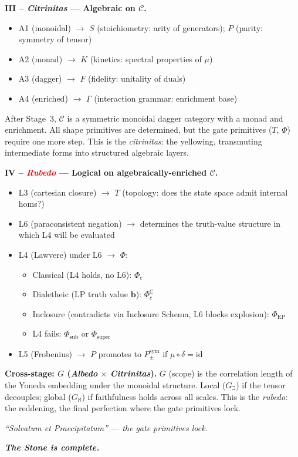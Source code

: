 \documentclass[twocolumn]{article}
\begin{document}
\bigskip
\noindent\textbf{\large III -- \colorbox{yellow!20}{\textcolor{yellow!90!black}{\emph{Citrinitas}}} --- Algebraic on $\mathcal{C}$.}
\begin{itemize}[nosep, leftmargin=1.5em]
\item A1 (monoidal) $\to$ $S$ (stoichiometry: arity of generators); $P$ (parity: symmetry of tensor)
\item A2 (monad) $\to$ $K$ (kinetics: spectral properties of $\mu$)
\item A3 (dagger) $\to$ $F$ (fidelity: unitality of duals)
\item A4 (enriched) $\to$ $\Gamma$ (interaction grammar: enrichment base)
\end{itemize}
After Stage~3, $\mathcal{C}$ is a symmetric monoidal dagger category with a monad and enrichment.
All shape primitives are determined, but the gate primitives ($T$, $\Phi$) require one more step.
{\large This is the \emph{citrinitas}: the yellowing, transmuting intermediate forms into structured algebraic layers.}

\bigskip
\noindent\textbf{\large IV -- \textcolor{red}{\emph{Rubedo}} --- Logical on algebraically-enriched $\mathcal{C}$.}
\begin{itemize}[nosep, leftmargin=1.5em]
\item L3 (cartesian closure) $\to$ $T$ (topology: does the state space admit internal homs?)
\item L6 (paraconsistent negation) $\to$ determines the truth-value structure in which L4 will be evaluated
\item L4 (Lawvere) under L6 $\to$ $\Phi$:
\begin{itemize}[nosep, leftmargin=1em]
\item[\small$\circ$] Classical (L4 holds, no L6): $\Phi_c$
\item[\small$\circ$] Dialetheic (LP truth value $\mathbf{b}$): $\Phi_c^\mathbb{C}$
\item[\small$\circ$] Inclosure (contradicts via Inclosure Schema, L6 blocks explosion): $\Phi_\text{EP}$
\item[\small$\circ$] L4 fails: $\Phi_\text{sub}$ or $\Phi_\text{super}$
\end{itemize}
\item L5 (Frobenius) $\to$ $P$ promotes to $P_{\pm}^{\text{sym}}$ if $\mu \circ \delta = \text{id}$
\end{itemize}

\bigskip
\noindent\textbf{Cross-stage: $G$ (\emph{Albedo} $\times$ \emph{Citrinitas}).}
$G$ (scope) is the correlation length of the Yoneda embedding under the monoidal structure.
Local ($G_\beth$) if the tensor decouples; global ($G_\aleph$) if faithfulness holds across all scales.
\medskip
{\large This is the \emph{rubedo}: the reddening, the final perfection where the gate primitives lock.}

\bigskip
\textit{\large ``Solvatum et Praecipitatum'' --- the gate primitives lock.}

\bigskip
\textbf{\textit{\Large The Stone is complete.}}
\end{document}
